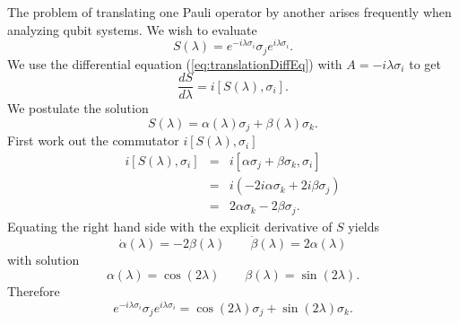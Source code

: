The problem of translating one Pauli operator by another arises frequently when analyzing qubit systems.
We wish to evaluate \begin{equation}
S(\lambda) = e^{-i\lambda\sigma_i}\sigma_j e^{i\lambda\sigma_i}. \end{equation}
We use the differential equation (\ref{eq:translationDiffEq}) with $A=-i\lambda\sigma_i$ to get \begin{equation}
\frac{dS}{d\lambda} = i[S(\lambda),\sigma_i]. \end{equation}
We postulate the solution \begin{equation}
S(\lambda) = \alpha(\lambda)\sigma_j + \beta(\lambda)\sigma_k. \end{equation}
First work out the commutator $i[S(\lambda),\sigma_i]$ \begin{eqnarray*}
i[S(\lambda),\sigma_i] &=& i[\alpha\sigma_j + \beta\sigma_k, \sigma_i] \\
&=& i \left( -2i\alpha \sigma_k + 2i\beta \sigma_j \right) \\
&=& 2\alpha \sigma_k - 2\beta \sigma_j. \end{eqnarray*}
Equating the right hand side with the explicit derivative of $S$ yields \begin{equation}
\dot{\alpha}(\lambda) = -2\beta(\lambda) \qquad \dot{\beta}(\lambda) = 2\alpha(\lambda) \nonumber \end{equation}
with solution \begin{equation}
\alpha(\lambda) = \cos \left( 2\lambda \right) \qquad \beta(\lambda) = \sin \left( 2\lambda \right). \nonumber \end{equation}
Therefore \begin{equation}
e^{-i\lambda\sigma_i}\sigma_j e^{i\lambda\sigma_i} = \cos \left( 2\lambda \right) \sigma_j + \sin \left( 2\lambda \right) \sigma_k. \end{equation}
